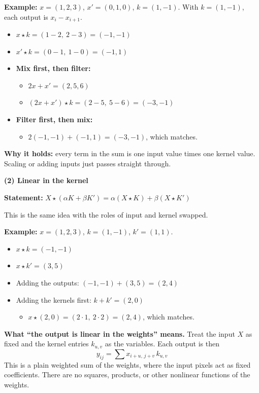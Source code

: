 \textbf{Example:} $x = (1, 2, 3)$, $x' = (0, 1, 0)$, $k = (1, -1)$. With $k = (1, -1)$, each output is $x_i - x_{i+1}$.
\begin{itemize}
  \item $x \star k = (1-2,\ 2-3) = (-1, -1)$
  \item $x' \star k = (0-1,\ 1-0) = (-1, 1)$
  \item \textbf{Mix first, then filter:}
  \begin{itemize}
    \item $2x + x' = (2, 5, 6)$
    \item $(2x + x') \star k = (2-5,\ 5-6) = (-3, -1)$
  \end{itemize}
  \item \textbf{Filter first, then mix:}
  \begin{itemize}
    \item $2(-1, -1) + (-1, 1) = (-3, -1)$, which matches.
  \end{itemize}
\end{itemize}
\textbf{Why it holds:} every term in the sum is one input value times one kernel value. Scaling or adding inputs just passes straight through.

\textbf{(2) Linear in the kernel}

\textbf{Statement:} $X \star (\alpha K + \beta K') = \alpha (X \star K) + \beta (X \star K')$

This is the same idea with the roles of input and kernel swapped.

\textbf{Example:} $x = (1, 2, 3)$, $k = (1, -1)$, $k' = (1, 1)$.
\begin{itemize}
  \item $x \star k = (-1, -1)$
  \item $x \star k' = (3, 5)$
  \item Adding the outputs: $(-1, -1) + (3, 5) = (2, 4)$
  \item Adding the kernels first: $k + k' = (2, 0)$
  \begin{itemize}
    \item $x \star (2, 0) = (2\cdot 1,\ 2\cdot 2) = (2, 4)$, which matches.
  \end{itemize}
\end{itemize}

\textbf{What ``the output is linear in the weights'' means.} Treat the input $X$ as fixed and the kernel entries $k_{u,v}$ as the variables. Each output is then
\[
y_{ij} = \sum x_{i+u,\, j+v}\, k_{u,v}
\]
This is a plain weighted sum of the weights, where the input pixels act as fixed coefficients. There are no squares, products, or other nonlinear functions of the weights.

